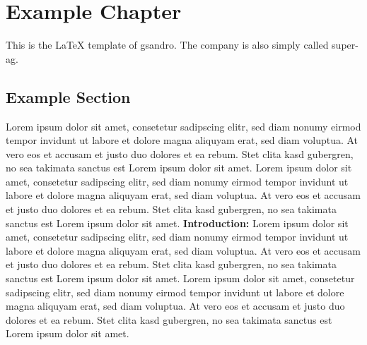 \chapter{Example Chapter}
This is the \LaTeX{} template of gsandro. The company is also simply called \ac{super-ag}.

\section{Example Section}
Lorem ipsum dolor sit amet, consetetur sadipscing elitr, 
sed diam nonumy eirmod tempor invidunt ut labore et dolore 
magna aliquyam erat, sed diam voluptua. At vero eos et accusam 
et justo duo dolores et ea rebum. Stet clita kasd gubergren, 
no sea takimata sanctus est Lorem ipsum dolor sit amet. 
Lorem ipsum dolor sit amet, consetetur sadipscing elitr, 
sed diam nonumy eirmod tempor invidunt ut labore et dolore 
magna aliquyam erat, sed diam voluptua. At vero eos et accusam 
et justo duo dolores et ea rebum. Stet clita kasd gubergren, 
no sea takimata sanctus est Lorem ipsum dolor sit amet.
	\textbf{Introduction:}
	Lorem ipsum dolor sit amet, consetetur sadipscing elitr, 
	sed diam nonumy eirmod tempor invidunt ut labore et dolore 
	magna aliquyam erat, sed diam voluptua. At vero eos et accusam 
	et justo duo dolores et ea rebum. Stet clita kasd gubergren, 
	no sea takimata sanctus est Lorem ipsum dolor sit amet. 
	Lorem ipsum dolor sit amet, consetetur sadipscing elitr, 
	sed diam nonumy eirmod tempor invidunt ut labore et dolore 
	magna aliquyam erat, sed diam voluptua. At vero eos et accusam 
	et justo duo dolores et ea rebum. Stet clita kasd gubergren, 
	no sea takimata sanctus est Lorem ipsum dolor sit amet.
